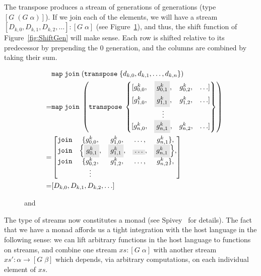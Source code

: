 The transpose produces a stream of generations of generations (type $[G\;(G\;\alpha)]$). If we join each of the elements, we will have a stream $[D_{k,0}, D_{k,1}, D_{k,2}, \ldots] : [G\;\alpha]$ (see Figure~\ref{fig:Transpose}), and thus, the shift function of Figure~\ref{fig:ShiftGen} will make sense. Each row is shifted relative to its predecessor by prepending the 0 generation, and the columns are combined by taking their sum.

\begin{figure}
  \begin{align*}
    &\code{map}\;\code{join}\;(\code{transpose}\;\{d_{k,0}, d_{k,1}, \ldots, d_{k,n}\})\\
  = &\code{map}\;\code{join}\;\left(\code{transpose}\;\left\{\begin{matrix}
        [g^k_{0,0}, & \colorbox{gray}{$g^k_{0,1}$}, & g^k_{0,2}, &\ldots]\\
        [g^k_{1,0}, & \colorbox{gray}{$g^k_{1,1}$}, & g^k_{1,2}, &\ldots]\\
                  & \vdots\\
        [g^k_{n,0}, & \colorbox{gray}{$g^k_{n,1}$}, & g^k_{n,2}, &\ldots]
      \end{matrix}\right\}\right)\\
      = &\left[\begin{matrix}
        \code{join}&\{g^k_{0,0}, & g^k_{1,0}, &\ldots, & g^k_{n,1}\},\\
        \code{join}&\Big\{\colorbox{gray}{$g^k_{0,1}$}, & \colorbox{gray}{$g^k_{1,1}$}, &\colorbox{gray}{$\ldots$}, & \colorbox{gray}{$g^k_{n,1}$}\Big\},\\
        \code{join}&\{g^k_{0,2}, & g^k_{1,2}, &\ldots, & g^k_{n,2}\},\\
                   & \vdots
                 \end{matrix}\right]\\
      \quad= &[D_{k,0}, D_{k,1}, D_{k,2}, \ldots]
  \end{align*}
\caption{ and }
\label{fig:Transpose}
\end{figure}

The type of streams now constitutes a monad (see Spivey~\cite{SearchAlgebras} for details). The fact that we have a monad affords us a tight integration with the host language in the following sense: we can lift arbitrary functions in the host language to functions on streams, and combine one stream $xs : [G\;\alpha]$ with another stream $xs' : \alpha \rightarrow [G\;\beta]$ which depends, via arbitrary computations, on each individual element of $xs$. 

